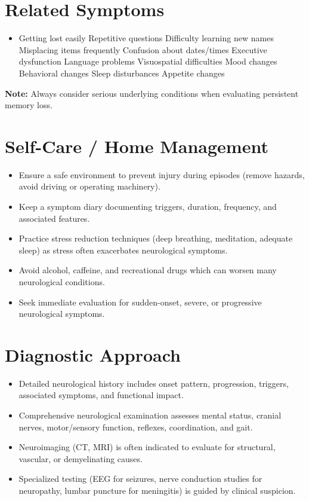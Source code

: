 \section*{Related Symptoms}
\begin{itemize}
  \item Getting lost easily Repetitive questions Difficulty learning new names Misplacing items frequently Confusion about dates/times Executive dysfunction Language problems Visuospatial difficulties Mood changes Behavioral changes Sleep disturbances Appetite changes
\end{itemize}
\textbf{Note:} Always consider serious underlying conditions when evaluating persistent memory loss.

\section*{Self-Care / Home Management}
\begin{itemize}
  \item Ensure a safe environment to prevent injury during episodes (remove hazards, avoid driving or operating machinery).
  \item Keep a symptom diary documenting triggers, duration, frequency, and associated features.
  \item Practice stress reduction techniques (deep breathing, meditation, adequate sleep) as stress often exacerbates neurological symptoms.
  \item Avoid alcohol, caffeine, and recreational drugs which can worsen many neurological conditions.
  \item Seek immediate evaluation for sudden-onset, severe, or progressive neurological symptoms.
\end{itemize}

\section*{Diagnostic Approach}
\begin{itemize}
  \item Detailed neurological history includes onset pattern, progression, triggers, associated symptoms, and functional impact.
  \item Comprehensive neurological examination assesses mental status, cranial nerves, motor/sensory function, reflexes, coordination, and gait.
  \item Neuroimaging (CT, MRI) is often indicated to evaluate for structural, vascular, or demyelinating causes.
  \item Specialized testing (EEG for seizures, nerve conduction studies for neuropathy, lumbar puncture for meningitis) is guided by clinical suspicion.
\end{itemize}

